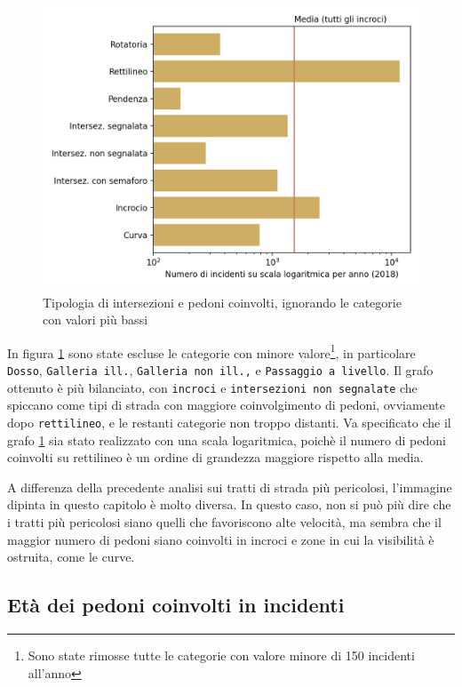 \documentclass[a4paper]{report}
\newcommand{\columnstyle}[1]{\texttt{#1}}
\begin{document}
\begin{figure}
    \includegraphics[width=\linewidth]{../src/incidenti/incidenti_senza_coords/pedoni/pedoni_no_rett.png}
    \caption{Tipologia di intersezioni e pedoni coinvolti, ignorando le categorie con valori più bassi}
    \label{fig:pedoni-no-rett}
\end{figure}

In figura \ref{fig:pedoni-no-rett} sono state escluse le categorie con minore 
valore\footnote{Sono state rimosse tutte le categorie con valore minore di 150 incidenti 
all'anno}, 
in particolare \columnstyle{Dosso}, \columnstyle{Galleria ill.}, \columnstyle{Galleria non ill.,} 
e \columnstyle{Passaggio a livello}.
Il grafo ottenuto è più bilanciato, con \columnstyle{incroci} e 
\columnstyle{intersezioni non segnalate} che spiccano come tipi di strada con 
maggiore coinvolgimento di pedoni, ovviamente dopo \columnstyle{rettilineo}, 
e le restanti categorie non troppo distanti.
Va specificato che il grafo \ref{fig:pedoni-no-rett} sia stato realizzato con una scala 
logaritmica, poichè il numero di pedoni coinvolti su rettilineo è un ordine di grandezza 
maggiore rispetto alla media.

A differenza della precedente analisi sui tratti di strada più pericolosi, 
l'immagine dipinta in questo capitolo è molto diversa.
In questo caso, non si può più dire che i tratti più pericolosi siano quelli che favoriscono 
alte velocità, ma sembra che il maggior numero di pedoni siano coinvolti in incroci e zone in 
cui la visibilità è ostruita, come le curve.

\subsection{Età dei pedoni coinvolti in incidenti}
\end{document}
